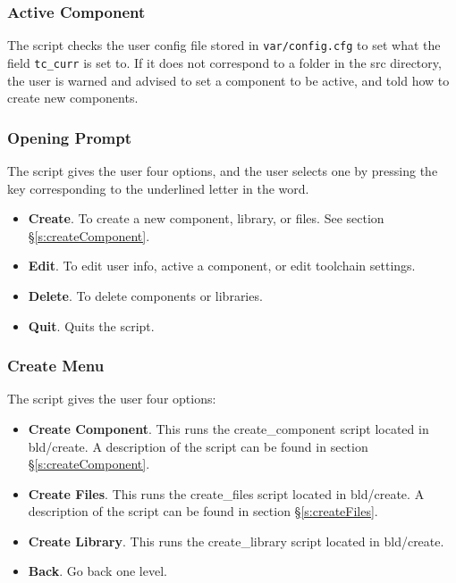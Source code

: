 \documentclass[a4paper, oneside, 11pt, titlepage, onecolumn, openright]{report}
\begin{document}
\subsubsection{Active Component}
			\label{sss:VFstartActiveComponent}
			
			The script checks the user config file stored in \texttt{var/config.cfg} to set what the field \texttt{tc\_curr} is set to. If it does not correspond to a folder in the src directory, the user is warned and advised to set a component to be active, and told how to create new components.
			
\subsubsection{Opening Prompt}
			\label{sss:VFstartOpeningPrompt}
			The script gives the user four options, and the user selects one by pressing the key corresponding to the underlined letter in the word.
\begin{itemize}
\item \textbf{Create}. To create a new component, library, or files. See section \S\ref{s:createComponent}.
\item \textbf{Edit}. To edit user info, active a component, or edit toolchain settings.
\item \textbf{Delete}. To delete components or libraries.
\item \textbf{Quit}. Quits the script.
\end{itemize}			
			 
			
\subsubsection{Create Menu}
			\label{sss:VFstartCreateMenu}
			The script gives the user four options:
\begin{itemize}
\item \textbf{Create Component}. This runs the create\_component script located in bld/create. A description of the script can be found in section \S\ref{s:createComponent}.
\item \textbf{Create Files}. This runs the create\_files script located in bld/create. A description of the script can be found in section \S\ref{s:createFiles}.
\item \textbf{Create Library}. This runs the create\_library script located in bld/create.
\item \textbf{Back}. Go back one level.
\end{itemize}				
			
\end{document}
